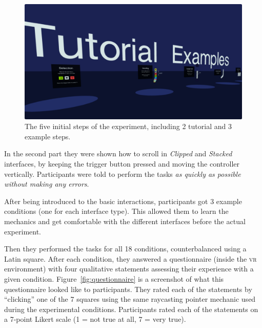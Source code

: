 \documentclass[nobib]{tufte-book} %
\begin{document}
\begin{figure}[h]
  \includegraphics[width=\linewidth]{tutorials.png}
  \caption{The five initial steps of the experiment, including 2 tutorial and 3 example steps.}
  \label{fig:tutorials}
\end{figure}

In the second part they were shown how to scroll in \emph{Clipped} and \emph{Stacked} interfaces, by keeping the trigger button pressed and moving the controller vertically.
Participants were told to perform the tasks \emph{as quickly as possible without making any errors}.

After being introduced to the basic interactions, participants got 3 example conditions (one for each interface type). This allowed them to learn the mechanics and get comfortable with the different interfaces before the actual experiment.

Then they performed the tasks for all 18 conditions, counterbalanced using a Latin square. After each condition, they answered a questionnaire (inside the \textsc{vr} environment) with four qualitative statements assessing their experience with a given condition. Figure~\ref{fig:questionnaire} is a screenshot of what this questionnaire looked like to participants. They rated each of the statements by ``clicking'' one of the 7 squares using the same raycasting pointer mechanic used during the experimental conditions. Participants rated each of the statements on a 7-point Likert scale (1 = not true at all, 7 = very true).
\end{document}
